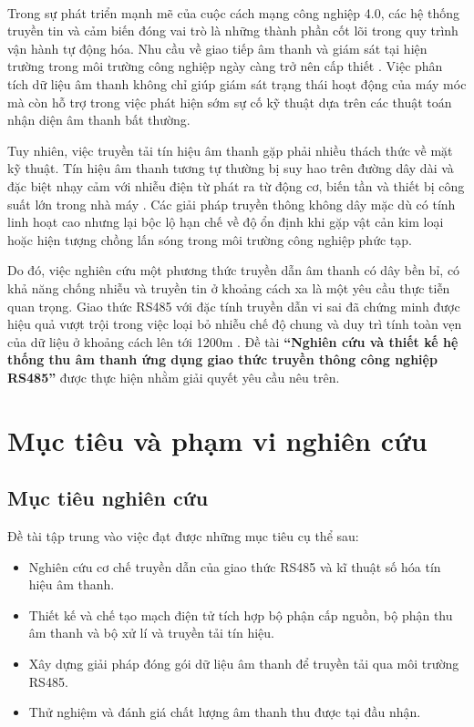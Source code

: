 \documentclass[a4paper]{report}
\begin{document}
\ 

Trong sự phát triển mạnh mẽ của cuộc cách mạng công nghiệp 4.0, các hệ thống truyền tin và cảm biến đóng vai trò là những thành phần cốt lõi trong quy trình vận hành tự động hóa. Nhu cầu về giao tiếp âm thanh và giám sát tại hiện trường trong môi trường công nghiệp ngày càng trở nên cấp thiết \cite{Li2025}. Việc phân tích dữ liệu âm thanh không chỉ giúp giám sát trạng thái hoạt động của máy móc mà còn hỗ trợ trong việc phát hiện sớm sự cố kỹ thuật dựa trên các thuật toán nhận diện âm thanh bất thường.

Tuy nhiên, việc truyền tải tín hiệu âm thanh gặp phải nhiều thách thức về mặt kỹ thuật. Tín hiệu âm thanh tương tự thường bị suy hao trên đường dây dài và đặc biệt nhạy cảm với nhiễu điện từ phát ra từ động cơ, biến tần và thiết bị công suất lớn trong nhà máy \cite{Whitlock2005}. Các giải pháp truyền thông không dây mặc dù có tính linh hoạt cao nhưng lại bộc lộ hạn chế về độ ổn định khi gặp vật cản kim loại hoặc hiện tượng chồng lấn sóng trong môi trường công nghiệp phức tạp. 

Do đó, việc nghiên cứu một phương thức truyền dẫn âm thanh có dây bền bỉ, có khả năng chống nhiễu và truyền tin ở khoảng cách xa là một yêu cầu thực tiễn quan trọng. Giao thức RS485 với đặc tính truyền dẫn vi sai đã chứng minh được hiệu quả vượt trội trong việc loại bỏ nhiễu chế độ chung và duy trì tính toàn vẹn của dữ liệu ở khoảng cách lên tới 1200m \cite{tao2026research}. Đề tài \textbf{``Nghiên cứu và thiết kế hệ thống thu âm thanh ứng dụng giao thức truyền thông công nghiệp RS485''} được thực hiện nhằm giải quyết yêu cầu nêu trên.

\section{Mục tiêu và phạm vi nghiên cứu}
\subsection{Mục tiêu nghiên cứu}
Đề tài tập trung vào việc đạt được những mục tiêu cụ thể sau:
\begin{itemize}
    \item Nghiên cứu cơ chế truyền dẫn của giao thức RS485 và kĩ thuật số hóa tín hiệu âm thanh.
    \item Thiết kế và chế tạo mạch điện tử tích hợp bộ phận cấp nguồn, bộ phận thu âm thanh và bộ xử lí và truyền tải tín hiệu.
    \item Xây dựng giải pháp đóng gói dữ liệu âm thanh để truyền tải qua môi trường RS485.
    \item Thử nghiệm và đánh giá chất lượng âm thanh thu được tại đầu nhận.
\end{itemize}
\end{document}
